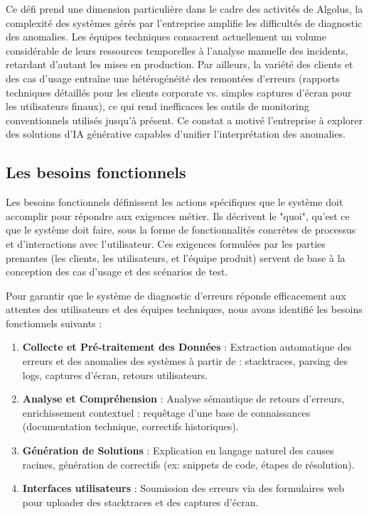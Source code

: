 \documentclass[12pt,a4paper]{report}
\begin{document}
	Ce défi prend une dimension particulière dans le cadre des activités de Algolus, la complexité des systèmes gérés par l'entreprise amplifie les difficultés de diagnostic des anomalies. Les équipes techniques consacrent actuellement un volume considérable de leurs ressources temporelles à l'analyse manuelle des incidents, retardant d'autant les mises en production. Par ailleurs, la variété des clients et des cas d'usage entraîne une hétérogénéité des remontées d'erreurs (rapports techniques détaillés pour les clients corporate vs. simples captures d'écran pour les utilisateurs finaux), ce qui rend inefficaces les outils de monitoring conventionnels utilisés jusqu'à présent. Ce constat a motivé l'entreprise à explorer des solutions d'IA générative capables d'unifier l'interprétation des anomalies.
	
	\subsection{Les besoins fonctionnels}
	
	Les besoins fonctionnels définissent les actions spécifiques que le système doit accomplir pour répondre aux exigences métier. Ils décrivent le "quoi", qu'est ce que le système doit faire, sous la forme de fonctionnalités concrètes de processus et d'interactions avec l'utilisateur. Ces exigences formulées par les parties prenantes  (les clients, les utilisateurs, et l'équipe produit) servent de base à la conception des cas d’usage et des scénarios de test.
	
	Pour garantir que le système de diagnostic d’erreurs réponde efficacement aux attentes des utilisateurs et des équipes techniques, nous avons identifié les besoins fonctionnels suivants :
	
	\begin{enumerate}
		
		\item \textbf{Collecte et Pré-traitement des Données} : Extraction automatique des erreurs et des anomalies des systèmes à partir de :
		stacktraces, parsing des logs, captures d’écran, retours utilisateurs.
		
		\item \textbf{Analyse et Compréhension} : Analyse sémantique de retours d’erreurs, enrichissement contextuel : requêtage d’une base de connaissances (documentation technique, correctifs historiques).
		
		\item \textbf{Génération de Solutions} : Explication en langage naturel des causes racines, génération de correctifs (ex: snippets de code, étapes de résolution).
		
		\item \textbf{Interfaces utilisateurs} : Soumission des erreurs via des formulaires web pour uploader des stacktraces et des captures d'écran.
		
	\end{enumerate}
	
\end{document}
